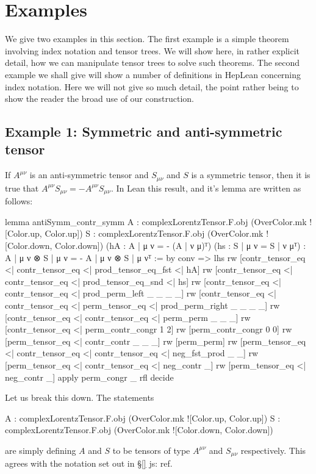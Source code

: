 \documentclass[a4paper, 11pt]{article}
\newcommand{\js}[1]{ {\color{magenta} js:  #1}}
\begin{document}
\section{Examples} \label{sec:examples}

We give two examples in this section. The first example is a simple theorem involving index notation and 
tensor trees. We will show here, in rather explicit detail, how we can manipulate tensor trees to solve 
such theorems. 
The second example we shall give will show a number of definitions in HepLean concerning index notation.
Here we will not give so much detail, the point rather being to show the reader the broad use of our 
construction. 

\subsection{Example 1: Symmetric and anti-symmetric tensor} \label{sec:exampleSymmAntiSymm}
If $A^{\mu \nu}$ is an anti-symmetric tensor and $S_{\mu \nu}$ and $S$ is a symmetric tensor, then
it is true that $A^{\mu \nu} S_{\mu \nu} = - A^{\mu \nu} S_{\mu \nu}$. In Lean this result, and 
it's lemma are written as follows: 
\begin{code}
lemma antiSymm_contr_symm 
    {A : complexLorentzTensor.F.obj (OverColor.mk ![Color.up, Color.up])}
    {S : complexLorentzTensor.F.obj (OverColor.mk ![Color.down, Color.down])}
    (hA : {A | μ ν = - (A | ν μ)}ᵀ) (hs : {S | μ ν = S | ν μ}ᵀ) :
    {A | μ ν ⊗ S | μ ν = - A | μ ν ⊗ S | μ ν}ᵀ := by
  conv =>
    lhs
    rw [contr_tensor_eq <| contr_tensor_eq <| prod_tensor_eq_fst <| hA]
    rw [contr_tensor_eq <| contr_tensor_eq <| prod_tensor_eq_snd <| hs]
    rw [contr_tensor_eq <| contr_tensor_eq <| prod_perm_left _ _ _ _]
    rw [contr_tensor_eq <| contr_tensor_eq <| perm_tensor_eq <| prod_perm_right _ _ _ _]
    rw [contr_tensor_eq <| contr_tensor_eq <| perm_perm _ _ _]
    rw [contr_tensor_eq <| perm_contr_congr 1 2]
    rw [perm_contr_congr 0 0]
    rw [perm_tensor_eq <| contr_contr _ _ _]
    rw [perm_perm]
    rw [perm_tensor_eq <| contr_tensor_eq <| contr_tensor_eq <| neg_fst_prod _ _]
    rw [perm_tensor_eq <| contr_tensor_eq <| neg_contr _]
    rw [perm_tensor_eq <| neg_contr _]
  apply perm_congr _ rfl
  decide
\end{code}
Let us break this down. The statements 
\begin{code} 
{A : complexLorentzTensor.F.obj (OverColor.mk ![Color.up, Color.up])}
{S : complexLorentzTensor.F.obj (OverColor.mk ![Color.down, Color.down])}
\end{code}
are simply defining $A$ and $S$ to be tensors of type $A^{\mu \nu}$ and $S_{\mu \nu}$ respectively.
This agrees with the notation set out in \S\ref{} \js{ref}.
\end{document}
